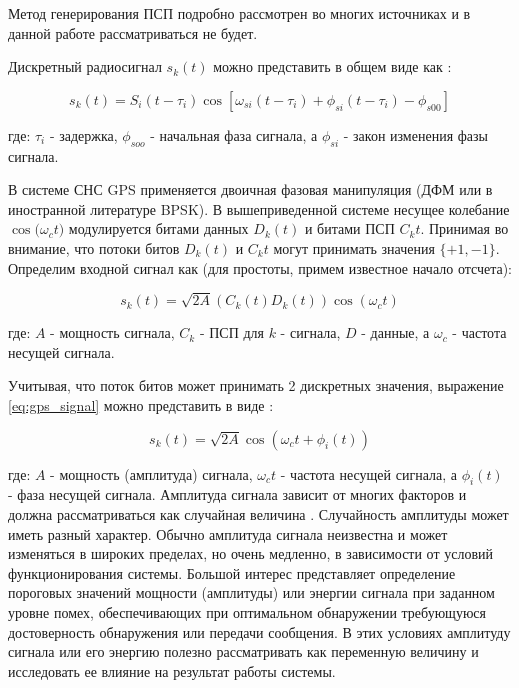 Метод генерирования ПСП подробно рассмотрен во многих источниках \cite{tsui, akos-book, kaplan}
и в данной работе рассматриваться не будет.

Дискретный радиосигнал $s_k(t)$ можно представить в общем виде как \cite{pestryakov-book}:
\begin{center}
\begin{equation}
	\label{eq:model_signal}
	s_k(t) = S_i(t - \tau_{i})\cos[\omega_{si}(t - \tau_{i}) + \phi_{si}(t - \tau_{i}) - \phi_{s00}]
\end{equation}
\end{center}
где: ${\tau_i}$ - задержка, ${\phi_{soo}}$ - начальная фаза сигнала, а ${\phi_{si}}$ - закон изменения фазы сигнала.

В системе СНС GPS применяется двоичная фазовая манипуляция (ДФМ или в иностранной литературе BPSK).
В вышеприведенной системе несущее колебание ${\cos(\omega_{c}t})$ модулируется битами данных ${D_k(t)}$ и битами ПСП
${C_k{t}}$. Принимая во внимание, что потоки битов ${D_k(t)}$ и ${C_k{t}}$ могут принимать значения
${\{+1, -1\}}$. Определим входной сигнал как (для простоты, примем известное начало отсчета):

\begin{center}
\begin{equation}
	\label{eq:gps_signal}
	s_k(t) = \sqrt{2A}(C_k(t)D_k(t))\cos(\omega_{c}t)
\end{equation}
\end{center}
где: ${A}$ - мощность сигнала, ${C_k}$ - ПСП для ${k}$ - сигнала, ${D}$ - данные, а ${\omega_{c}}$ - частота несущей сигнала.

Учитывая, что поток битов может принимать 2 дискретных значения, выражение \ref{eq:gps_signal} можно представить в виде \cite{sklyar}:
\begin{center}
\begin{equation}
	\label{eq:gps_signal_phase}
	s_k(t) = \sqrt{2A}\cos(\omega_{c}t + \phi_{i}(t))
\end{equation}
\end{center}
где: ${A}$ - мощность (амплитуда) сигнала, ${\omega_{c}t}$ - частота несущей сигнала, а ${\phi_{i}(t)}$ - фаза несущей сигнала.
Амплитуда сигнала зависит от многих факторов и должна рассматриваться как случайная величина \cite{pestryakov-book}. Случайность
амплитуды может иметь разный характер. Обычно амплитуда сигнала неизвестна и может изменяться в широких пределах,
но очень медленно, в зависимости от условий функционирования системы. Большой интерес представляет определение пороговых
значений мощности (амплитуды) или энергии сигнала при заданном уровне помех, обеспечивающих при оптимальном
обнаружении требующуюся достоверность обнаружения или передачи сообщения. В этих условиях амплитуду сигнала или его энергию
полезно рассматривать как переменную величину и исследовать ее влияние на результат работы системы.


